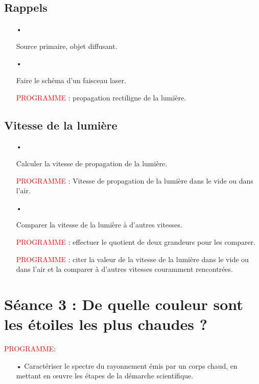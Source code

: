 \documentclass[12pt,a4paper,fleqn]{article}
\newcommand{\prog}{\textcolor{red}{PROGRAMME}}
\begin{document}
\subsection*{Rappels}

\begin{itemize}
\item[•] \anarai

Source primaire, objet diffusant.

\item[•] \rea{}

Faire le schéma d'un faisceau laser.

\prog{} : propagation rectiligne de la lumière.
\end{itemize}

\subsection*{Vitesse de la lumière}

\begin{itemize}
\item[•] \app{} \rea{}

Calculer la vitesse de propagation de la lumière.

\prog{} : Vitesse de propagation de la lumière dans le vide ou dans l'air.

\item[•] \rea{}

Comparer la vitesse de la lumière à d'autres vitesses.

\prog{} : effectuer le quotient de deux grandeurs pour les comparer.

\prog{} : citer la valeur de la vitesse de la lumière dans le vide ou dans l'air et la comparer à d'autres vitesses couramment rencontrées.
\end{itemize}





\newpage

\section*{\textcolor{bleu_f}{Séance 3 : De quelle couleur sont les étoiles les plus chaudes ?}}

\prog :
\begin{itemize}
\item[•] Caractériser le spectre du rayonnement émis par un corps chaud, en mettant en œuvre les étapes de la démarche scientifique.
\end{itemize}
\end{document}
